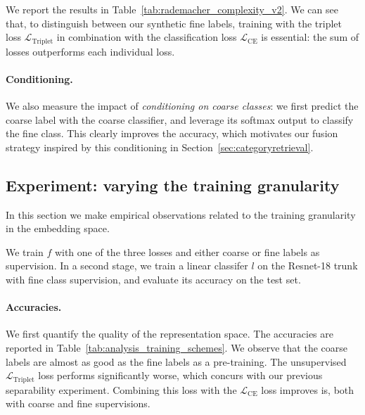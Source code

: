 We report the results in Table~\ref{tab:rademacher_complexity_v2}.
We can see that, to distinguish between our synthetic fine labels, training with the triplet loss $\mathcal{L}_\mathrm{Triplet}$ in combination with the classification loss $\mathcal{L}_\mathrm{CE}$ is essential: the sum of losses outperforms each individual loss.


\paragraph{Conditioning.}

We also measure the impact of \emph{conditioning on coarse classes}: we first predict the coarse label with the coarse classifier, and leverage its softmax output to classify the fine class. 
This clearly improves the accuracy, which motivates our fusion strategy inspired by this conditioning in Section~\ref{sec:categoryretrieval}.

\subsection{Experiment: varying the training granularity}

In this section we make empirical observations related to the training granularity in the embedding space. 

We train $f$ with one of the three losses and either coarse or fine labels as supervision. 
In a second stage, we train a linear classifer $l$ on the Resnet-18 trunk with fine class supervision, and evaluate its accuracy on the test set.

\paragraph{Accuracies.}

We first quantify the quality of the representation space. 
The accuracies are reported in Table~\ref{tab:analysis_training_schemes}. 
We observe that the coarse labels are almost as good as the fine labels as a pre-training. 
The unsupervised $\mathcal{L}_\mathrm{Triplet}$ loss performs significantly worse, which concurs with our previous separability experiment. 
Combining this loss with the $\mathcal{L}_\mathrm{CE}$ loss improves is, both with coarse and fine supervisions.

